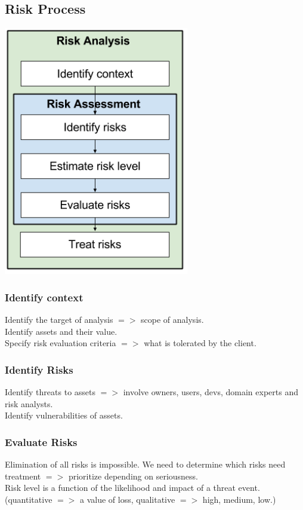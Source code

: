 \documentclass[10pt,a4paper,final]{report}
\begin{document}
\subsection{Risk Process}
\includegraphics[scale=.75]{RiskProcess.png}
\subsubsection{Identify context}
Identify the target of analysis $=>$ scope of analysis.\\
Identify assets and their value.\\
Specify risk evaluation criteria $=>$ what is tolerated by the client.
\subsubsection{Identify Risks}
Identify threats to assets $=>$ involve owners, users, devs, domain experts and risk analysts.\\
Identify vulnerabilities of assets.
\subsubsection{Evaluate Risks}
Elimination of all risks is impossible.
We need to determine which risks need treatment $=>$ prioritize depending on seriousness.\\
Risk level is a function of the likelihood and impact of a threat event.(quantitative $=>$ a value of loss, qualitative $=>$ high, medium, low.)
\end{document}
